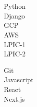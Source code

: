 \documentclass[9pt]{developercv}
\begin{document}
\\\\
\begin{minipage}[t]{0.49\textwidth}
	\Large
	\vspace{-\baselineskip}

	\faCircle \; {Python}\\
	\faCircle \; {Django}\\
	\faCircle \; {GCP}\\
	\faCircle \; {AWS}\\
	\faCircle \; {LPIC-1}\\
	\faCircle \; {LPIC-2}\\
\end{minipage}
\begin{minipage}[t]{0.50\textwidth}
	\Large
	\vspace{-\baselineskip}

	\faCircle \; {Git}\\
	\faCircle \; {Javascript}\\
	\faCircle \; {React}\\
	\faCircle \; {Next.js}\\
\end{minipage}

\hfill
\end{document}
